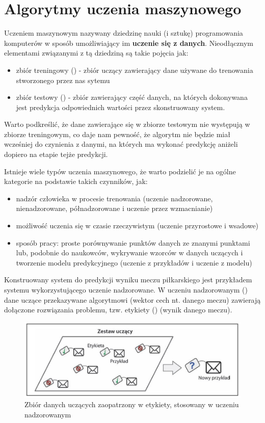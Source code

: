\section{Algorytmy uczenia maszynowego}
Uczeniem maszynowym nazywany dziedzinę nauki (i sztukę) programowania komputerów w sposób umożliwiający im \textbf{uczenie się z danych}. \cite{Geron} Nieodłącznym elementami związanymi z tą dziedziną są takie pojęcia jak: 
\begin{itemize}
    \item zbiór treningowy () - zbiór uczący zawierający dane używane do trenowania stworzonego przez nas sytemu
    \item zbiór testowy () - zbiór zawierający część danych, na których dokonywana jest predykcja odpowiednich wartości przez skonstruowany system.
\end{itemize}
Warto podkreślić, że dane zawierające się w zbiorze testowym nie występują w zbiorze treningowym, co daje nam pewność, że algorytm nie będzie miał wcześniej do czynienia z danymi, na których ma wykonać predykcję aniżeli dopiero na etapie tejże predykcji.

Istnieje wiele typów uczenia maszynowego, że warto podzielić je na ogólne kategorie na podstawie takich czynników, jak:
\begin{itemize}
    \item nadzór człowieka w procesie trenowania (uczenie nadzorowane, nienadzorowane, półnadzorowane i uczenie przez wzmacnianie)
    \item możliwość uczenia się w czasie rzeczywistym (uczenie przyrostowe i wsadowe)
    \item sposób pracy: proste porównywanie punktów danych ze znanymi punktami lub, podobnie do naukowców, wykrywanie wzorców w danych uczących i tworzenie modelu predykcyjnego (uczenie z przykładów i uczenie z modelu)
\end{itemize}

Konstruowany system do predykcji wyniku meczu piłkarskiego jest przykładem systemu wykorzystującego uczenie nadzorowane. W uczeniu nadzorowanym () dane uczące przekazywane algorytmowi (wektor cech nt. danego meczu) zawierają dołączone rozwiązania problemu, tzw. etykiety () (wynik danego meczu). \cite{Geron}

\begin{figure}[h] 
        \includegraphics[width=15cm]{figures/supervised-learning.JPG}
        \caption{Zbiór danych uczących zaopatrzony w etykiety, stosowany w uczeniu nadzorowanym}
\end{figure}

